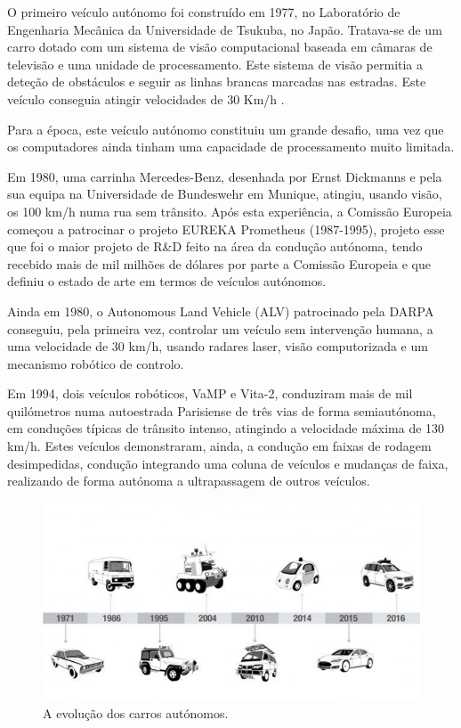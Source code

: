 \documentclass[a4paper,10pt]{texRel}
\begin{document}
O primeiro veículo autónomo foi construído em 1977, no Laboratório de Engenharia Mecânica da Universidade de Tsukuba, no Japão. Tratava-se de um carro dotado com um sistema de visão computacional baseada em câmaras de televisão e uma unidade de processamento. Este sistema de visão permitia a deteção de obstáculos e seguir as linhas brancas marcadas nas estradas. Este veículo conseguia atingir velocidades de 30 Km/h \cite{Robocorp}. 

Para a época, este veículo autónomo constituiu um grande desafio, uma vez que os computadores ainda tinham uma capacidade de processamento muito limitada.

Em 1980, uma carrinha Mercedes-Benz, desenhada por Ernst Dickmanns e pela sua equipa na Universidade de Bundeswehr em Munique, atingiu, usando visão, os 100 km/h numa rua sem trânsito. Após esta experiência, a Comissão Europeia começou a patrocinar o projeto EUREKA Prometheus (1987-1995), projeto esse que foi o maior projeto de R\&D feito na área da condução autónoma, tendo recebido mais de mil milhões de dólares por parte a Comissão Europeia e que definiu o estado de arte em termos de veículos autónomos.

Ainda em 1980, o Autonomous Land Vehicle (ALV) patrocinado pela DARPA conseguiu, pela primeira vez, controlar um veículo sem intervenção humana, a uma velocidade de 30 km/h, usando radares laser, visão computorizada e um mecanismo robótico de controlo.

Em 1994, dois veículos robóticos, VaMP e Vita-2, conduziram mais de mil quilómetros numa autoestrada Parisiense de três vias de forma semiautónoma, em conduções típicas de trânsito intenso, atingindo a velocidade máxima de 130 km/h. Estes veículos demonstraram, ainda, a condução em faixas de rodagem desimpedidas, condução integrando uma coluna de veículos e mudanças de faixa, realizando de forma autónoma a ultrapassagem de outros veículos.



\begin{figure}[H]
\centering
\includegraphics{imagens/cap2/time-line.png}
\caption{A evolução dos carros autónomos.}
\label{fig2}
\end{figure}
\end{document}
